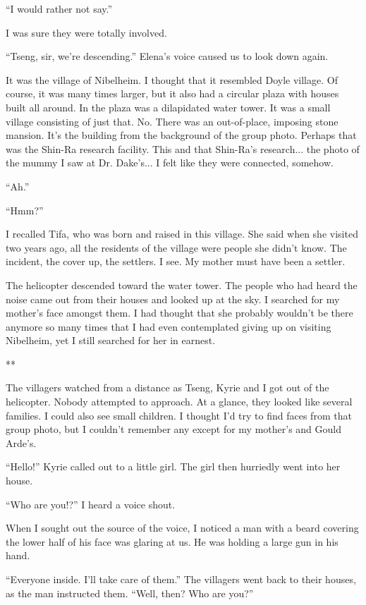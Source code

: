 \documentclass[oneside]{book}
\begin{document}
“I would rather not say.”

I was sure they were totally involved.

“Tseng, sir, we’re descending.” Elena’s voice caused us to look down again.

It was the village of Nibelheim. I thought that it resembled Doyle village. Of course, it was many times larger, but it also had a circular plaza with houses built all around. In the plaza was a dilapidated water tower. It was a small village consisting of just that. No. There was an out-of-place, imposing stone mansion. It’s the building from the background of the group photo. Perhaps that was the Shin-Ra research facility. This and that Shin-Ra’s research... the photo of the mummy I saw at Dr. Dake’s... I felt like they were connected, somehow.

“Ah.”

“Hmm?”

I recalled Tifa, who was born and raised in this village. She said when she visited two years ago, all the residents of the village were people she didn’t know. The incident, the cover up, the settlers. I see. My mother must have been a settler.

The helicopter descended toward the water tower. The people who had heard the noise came out from their houses and looked up at the sky. I searched for my mother’s face amongst them. I had thought that she probably wouldn’t be there anymore so many times that I had even contemplated giving up on visiting Nibelheim, yet I still searched for her in earnest.

**

The villagers watched from a distance as Tseng, Kyrie and I got out of the helicopter. Nobody attempted to approach. At a glance, they looked like several families. I could also see small children. I thought I’d try to find faces from that group photo, but I couldn’t remember any except for my mother’s and Gould Arde’s.

“Hello!” Kyrie called out to a little girl. The girl then hurriedly went into her house.

“Who are you!?” I heard a voice shout.

When I sought out the source of the voice, I noticed a man with a beard covering the lower half of his face was glaring at us. He was holding a large gun in his hand.

“Everyone inside. I’ll take care of them.” The villagers went back to their houses, as the man instructed them. “Well, then? Who are you?”
\end{document}
